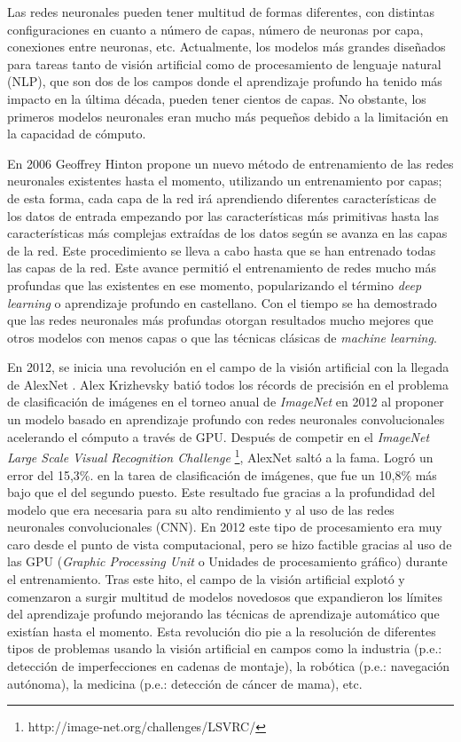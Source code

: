 Las redes neuronales pueden tener multitud de formas diferentes, con distintas configuraciones en cuanto a número de capas, número de neuronas por capa, conexiones entre neuronas, etc. Actualmente, los modelos más grandes diseñados para tareas tanto de visión artificial como de procesamiento de lenguaje natural (NLP), que son dos de los campos donde el aprendizaje profundo ha tenido más impacto en la última década, pueden tener cientos de capas. No obstante, los primeros modelos neuronales eran mucho más pequeños debido a la limitación en la capacidad de cómputo.

En 2006 Geoffrey Hinton \cite{geoffreyhinton} propone un nuevo método de entrenamiento de las redes neuronales existentes hasta el momento, utilizando un entrenamiento por capas; de esta forma, cada capa de la red irá aprendiendo diferentes características de los datos de entrada empezando por las características más primitivas hasta las características más complejas extraídas de los datos según se avanza en las capas de la red. Este procedimiento se lleva a cabo hasta que se han entrenado todas las capas de la red. Este avance permitió el entrenamiento de redes mucho más profundas que las existentes en ese momento, popularizando el término \textit{deep learning} o aprendizaje profundo en castellano. Con el tiempo se ha demostrado que las redes neuronales más profundas otorgan resultados mucho mejores que otros modelos con menos capas o que las técnicas clásicas de \textit{machine learning}.

En 2012, se inicia una revolución en el campo de la visión artificial con la llegada de AlexNet \cite{alexnet}. Alex Krizhevsky batió todos los récords de precisión en el problema de clasificación de imágenes en el torneo anual de \textit{ImageNet} en 2012 al proponer un modelo basado en aprendizaje profundo con redes neuronales convolucionales acelerando el cómputo a través de GPU. Después de competir en el \textit{ImageNet Large Scale Visual Recognition Challenge} \footnote{http://image-net.org/challenges/LSVRC/}, AlexNet saltó a la fama. Logró un error del 15,3\%. en la tarea de clasificación de imágenes, que fue un 10,8\% más bajo que el del segundo puesto. Este resultado fue gracias a la profundidad del modelo que era necesaria para su alto rendimiento y al uso de las redes neuronales convolucionales (CNN). En 2012 este tipo de procesamiento era muy caro desde el punto de vista computacional, pero se hizo factible gracias al uso de las GPU (\textit{Graphic Processing Unit} o Unidades de procesamiento gráfico) durante el entrenamiento.
Tras este hito, el campo de la visión artificial explotó y comenzaron a surgir multitud de modelos novedosos que expandieron los límites del aprendizaje profundo mejorando las técnicas de aprendizaje automático que existían hasta el momento. Esta revolución dio pie a la resolución de diferentes tipos de problemas usando la visión artificial en campos como la industria (p.e.: detección de imperfecciones en cadenas de montaje), la robótica (p.e.: navegación autónoma), la medicina (p.e.: detección de cáncer de mama), etc.


